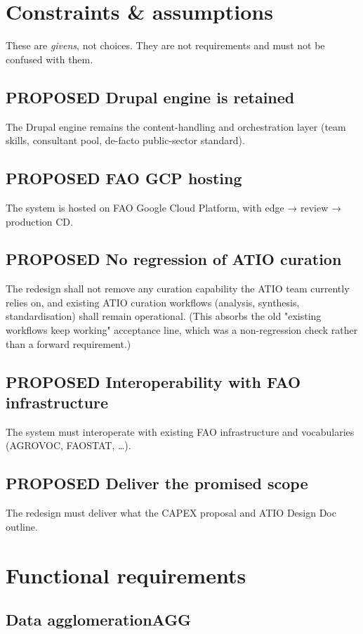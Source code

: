 \documentclass{scrartcl}
\begin{document}
\section{Constraints \& assumptions}
\label{sec:orgb6a4412}
These are \emph{givens}, not choices. They are not requirements and must not be confused with them.
\subsection{{\bfseries\sffamily PROPOSED} Drupal engine is retained}
\label{sec:org594bd7f}
The Drupal engine remains the content-handling and orchestration layer (team skills, consultant pool, de-facto public-sector standard).
\subsection{{\bfseries\sffamily PROPOSED} FAO GCP hosting}
\label{sec:orgcbb76cf}
The system is hosted on FAO Google Cloud Platform, with edge → review → production CD.
\subsection{{\bfseries\sffamily PROPOSED} No regression of ATIO curation}
\label{sec:org321b995}
The redesign shall not remove any curation capability the ATIO team currently relies on, and existing ATIO curation workflows (analysis, synthesis, standardisation) shall remain operational. (This absorbs the old "existing workflows keep working" acceptance line, which was a non-regression check rather than a forward requirement.)
\subsection{{\bfseries\sffamily PROPOSED} Interoperability with FAO infrastructure}
\label{sec:orgcd15e6d}
The system must interoperate with existing FAO infrastructure and vocabularies (AGROVOC, FAOSTAT, …).
\subsection{{\bfseries\sffamily PROPOSED} Deliver the promised scope}
\label{sec:orge7325b9}
The redesign must deliver what the CAPEX proposal and ATIO Design Doc outline.
\section{Functional requirements}
\label{sec:org9bdc340}
\subsection{Data agglomeration\hfill{}\textsc{AGG}}
\label{sec:org69e6b04}
\end{document}
